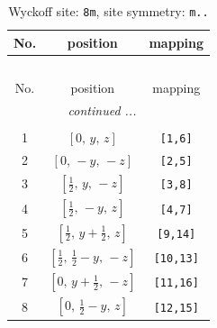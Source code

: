 \documentclass[fleqn,8pt]{jsarticle}
\begin{document}
\begin{longtable}{ccc}
\caption{Wyckoff site: {\tt 8m}, site symmetry: {\tt m..}}
 \\
 \hline \hline
No. & position & mapping \\ \hline \endfirsthead

\multicolumn{2}{l}{\tablename\ \thetable{}} \\
 \hline \hline
No. & position & mapping \\ \hline \endhead

 \hline \hline
\multicolumn{2}{r}{\footnotesize\it continued ...} \\ \endfoot

 \hline \hline
\multicolumn{2}{r}{} \\ \endlastfoot

1 & $\left[ 0,\, y,\, z \right]$ & {\tt [1,6]} \\ \hline
2 & $\left[ 0,\, - y,\, - z \right]$ & {\tt [2,5]} \\ \hline
3 & $\left[ \frac{1}{2},\, y,\, - z \right]$ & {\tt [3,8]} \\ \hline
4 & $\left[ \frac{1}{2},\, - y,\, z \right]$ & {\tt [4,7]} \\ \hline
5 & $\left[ \frac{1}{2},\, y + \frac{1}{2},\, z \right]$ & {\tt [9,14]} \\ \hline
6 & $\left[ \frac{1}{2},\, \frac{1}{2} - y,\, - z \right]$ & {\tt [10,13]} \\ \hline
7 & $\left[ 0,\, y + \frac{1}{2},\, - z \right]$ & {\tt [11,16]} \\ \hline
8 & $\left[ 0,\, \frac{1}{2} - y,\, z \right]$ & {\tt [12,15]} \\
\end{longtable}
\renewcommand{\arraystretch}{1.2}
\end{document}
